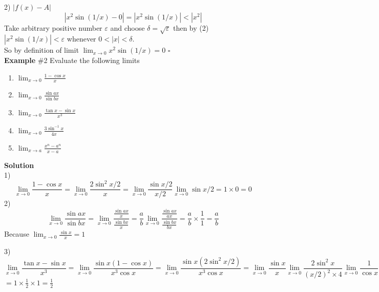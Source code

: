 \documentclass[10pt,a4paper]{article}
\begin{document}
2)  $|f(x)-A|$
\begin{equation}
|x^2\sin(1/x)-0|=|x^2\sin(1/x)|<|x^2|  
\end{equation}
Take arbitrary positive number $\varepsilon$ and choose $\delta=\sqrt{\varepsilon}$ then by (2)\\ $|x^2\sin(1/x)|<\varepsilon$ whenever $0<|x|<\delta$.\\ So by definition of limit  $\displaystyle{\lim_{x \to 0}} x^2\sin(1/x)=0$ 
 \hfill $\square$
 \\ 
 \textbf{Example} \#2 Evaluate the following limits 
 \begin{enumerate}
 \item $\displaystyle{\lim_{x \to 0} \frac{1-\cos x}{x}}$
 \item $\displaystyle{\lim_{x \to 0} \frac{\sin ax}{\sin bx}}$
 \item $\displaystyle{\lim_{x \to 0} \frac{\tan x -\sin x}{x^3}}$
 \item $\displaystyle{\lim_{x \to 0} \frac{3\sin^{-1} x}{4x}}$
 \item $\displaystyle{\lim_{x \to a} \frac{x^n-a^n}{x-a}}$
 \end{enumerate}
 \textbf{Solution} \\
 1) \begin{equation*}
 	\lim_{x \to 0} \frac{1-\cos x}{x}=\lim_{x \to 0} \frac{2\sin^2 x/2}{x} =\lim_{x \to 0} \frac{\sin x/2}{x/2}  \lim_{x \to 0} \sin x/2 =1\times0 =0
 \end{equation*}
 2) \begin{equation*}
 \lim_{x \to 0} \frac{\sin ax}{\sin bx} = \lim_{x \to 0} \frac{\frac{\sin ax}{x}}{\frac{\sin bx}{x}} = \frac{a}{b} \lim_{x \to 0} \frac{\frac{\sin ax}{ax}}{\frac{\sin bx}{bx}} = \frac{a}{b} \times \frac{1}{1}=\frac{a}{b}
 \end{equation*}
 Because  $\displaystyle{\lim_{x \to 0} \frac{\sin x}{x}=1}$  \par 
 3) 
 \begin{equation*}
 \lim_{x \to 0} \frac{\tan x -\sin x}{x^3}= \lim_{x \to 0} \frac{\sin x(1 -\cos x)}{x^3 \cos x}= \lim_{x \to 0} \frac{\sin x(2\sin^2x/2)}{x^3 \cos x}=\lim_{x \to 0} \frac{\sin x}{x}\lim_{x \to 0} \frac{2\sin^2x}{(x/2)^2\times 4}\lim_{x \to 0} \frac{1}{\cos x}  
 \end{equation*}
 $\displaystyle{=1\times\frac{1}{2}\times1= \frac{1}{2}}$
 
\end{document}
